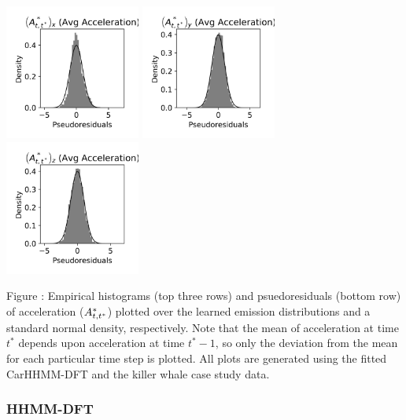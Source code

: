 \documentclass{article}
\begin{document}
\begin{center}
        \includegraphics[width=1.75in]{../Plots/CarHHMM2_psedoresids_Ax.png}
        \includegraphics[width=1.75in]{../Plots/CarHHMM2_psedoresids_Ay.png}
        \includegraphics[width=1.75in]{../Plots/CarHHMM2_psedoresids_Az.png}
        \end{center}
        
        \noindent Figure : Empirical histograms (top three rows) and psuedoresiduals (bottom row) of acceleration ($A^*_{t,t^*}$) plotted over the learned emission distributions and a standard normal density, respectively. Note that the mean of acceleration at time $t^*$ depends upon acceleration at time $t^*-1$, so only the deviation from the mean for each particular time step is plotted. All plots are generated using the fitted CarHHMM-DFT and the killer whale case study data.
        \addtocounter{fignum}{1}
        
        \newpage
        
        \subsubsection{HHMM-DFT}
        
\end{document}
